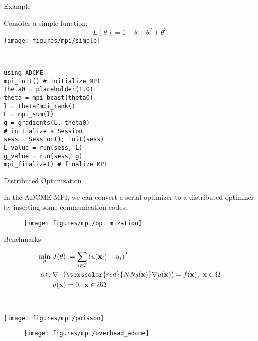 \documentclass[usenames,dvipsnames]{beamer}
\newcommand{\bx}{\mathbf{x}}
\begin{document}
\begin{frame}[fragile]{Example}

\begin{minipage}{.5\textwidth}
	Consider a simple function:
	$$L(\theta) = 1 + \theta + \theta^2 + \theta^3$$
		\texttt{[image: figures/mpi/simple]}
\end{minipage}~
\begin{minipage}{.5\textwidth}
	\begin{verbatim}
using ADCME
mpi_init() # initialize MPI 
theta0 = placeholder(1.0)
theta = mpi_bcast(theta0)
l = theta^mpi_rank()
L = mpi_sum(l)
g = gradients(L, theta0)
# initialize a Session
sess = Session(); init(sess)
L_value = run(sess, L) 
g_value = run(sess, g)
mpi_finalize() # finalize MPI 
	\end{verbatim}
\end{minipage}


\end{frame}


\begin{frame}{Distributed Optimization}
	
	In the ADCME-MPI, we can convert a serial optimizer to a distributed optimizer by inserting some communication codes:
\begin{figure}
\centering 
\texttt{[image: figures/mpi/optimization]}
\end{figure}
\end{frame}

\begin{frame}{Benchmarks}
	\begin{minipage}[c]{.52\textwidth}
		\begin{equation*}
			\begin{aligned}
				\min_{\theta}&\; J(\theta):=\sum_{i\in \mathcal{I}} \left( u(\bx_i) - u_i \right)^2\\ 
				\text{s.t.} &\; \nabla \cdot (\textcolor{red}{NN_\theta(\bx)} \nabla u(\bx))  = f(\bx),\ \bx \in \Omega \\ 
				&\; u(\bx) = 0,\  \bx \in \partial \Omega
			\end{aligned}
		\end{equation*}
	\end{minipage}~
	\begin{minipage}[c]{.48\textwidth}
		\texttt{[image: figures/mpi/poisson]}
	\end{minipage}
	
	
\end{frame}
\begin{frame}
	\begin{figure}[htpb]
		\centering 		
		\texttt{[image: figures/mpi/overhead\_adcme]}
	\end{figure}
\end{frame}
\end{document}
